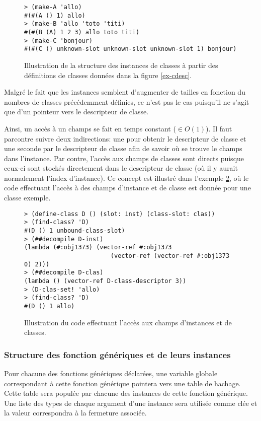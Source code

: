       \begin{figure}[h!]
        \begin{lstlisting}
> (make-A 'allo)
#(#(A () 1) allo)
> (make-B 'allo 'toto 'titi)
#(#(B (A) 1 2 3) allo toto titi)
> (make-C 'bonjour)
#(#(C () unknown-slot unknown-slot unknown-slot 1) bonjour)
        \end{lstlisting}
        \caption{Illustration de la structure des instances de classes à
          partir des définitions de classes données dans la figure
          \ref{ex-cdesc}.}
        \label{ex-struct-inst}
      \end{figure}

      Malgré le fait que les instances semblent d'augmenter de tailles
      en fonction du nombres de classes précédemment définies, ce n'est
      pas le cas puisqu'il ne s'agit que d'un pointeur vers le
      descripteur de classe.

      Ainsi, un accès à un champs se fait en temps constant ($\in
      O(1)$). Il faut parcontre suivre deux indirections: une pour
      obtenir le descripteur de classe et une seconde par le
      descripteur de classe afin de savoir où se trouve le champs dans
      l'instance. Par contre, l'accès aux champs de classes sont
      directs puisque ceux-ci sont stockés directement dans le
      descripteur de classe (où il y aurait normalement l'index
      d'instance). Ce concept est illustré dans l'exemple
      \ref{ex-slot-access}, où le code effectuant l'accès à des champs
      d'instance et de classe est donnée pour une classe exemple.

      \begin{figure}[h!]
        \begin{lstlisting}
> (define-class D () (slot: inst) (class-slot: clas))
> (find-class? 'D)
#(D () 1 unbound-class-slot)
> (##decompile D-inst)
(lambda (#:obj1373) (vector-ref #:obj1373 
                        (vector-ref (vector-ref #:obj1373 0) 2)))
> (##decompile D-clas)
(lambda () (vector-ref D-class-descriptor 3))
> (D-clas-set! 'allo)
> (find-class? 'D)
#(D () 1 allo)
        \end{lstlisting}
        \caption{Illustration du code effectuant l'accès aux champs
          d'instances et de classes.}
        \label{ex-slot-access}
      \end{figure}

    \subsubsection{Structure des fonction génériques et de leurs instances}
      \label{genfun-struct}
      Pour chacune des fonctions génériques déclarées, une variable
      globale correspondant à cette fonction générique pointera vers
      une table de hachage. Cette table sera populée par chacune des
      instances de cette fonction générique. Une liste des types de
      chaque argument d'une instance sera utilisée comme clée et la
      valeur correspondra à la fermeture associée.

